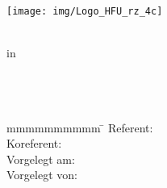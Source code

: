 
\begin{titlepage}
	\thispagestyle{empty}
	\texttt{[image: img/Logo\_HFU\_rz\_4c]}
	\enlargethispage{20mm}
	\begin{center}
		{\fontsize{18pt}{27pt}\selectfont \artderarbeit \\ in \\ \studiengang \\}
		{\fontsize{22pt}{55pt}\selectfont \textbf \titel \\}
		{\fontsize{18pt}{27pt}\selectfont \untertitel \\}
		\vfill
		\parbox{0cm}{\begin{tabbing}
			mmmmmmmmmm \= \kill
			Referent: \> \\
			Koreferent: \> \koreferent\\
			Vorgelegt am: \> \vorgelegtam\\
			Vorgelegt von: \> \studentname\\
			\> \studentnr\\
			\> \studentstr\\
			\> \studentstadt\\
			\> \studentemail\\
		\end{tabbing}}
	\end{center}
\end{titlepage}

\cleardoubleemptypage
